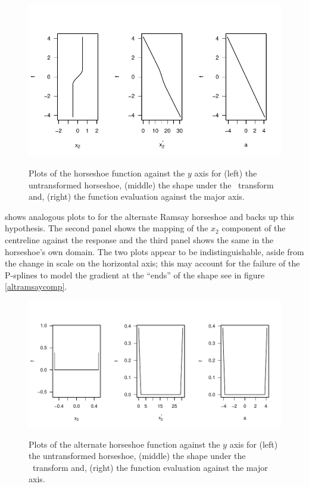 \begin{figure}[t]
\centering
\includegraphics[width=\textwidth]{sc/figs/centrelinelineplots.pdf} \\
\caption{Plots of the horseshoe function against the $y$ axis for (left) the untransformed horseshoe, (middle) the shape under the \sch\ transform and, (right) the function evaluation against the major axis.}
\label{centrelinelineplot}
\end{figure}

 shows analogous plots to  for the alternate Ramsay horseshoe and backs up this hypothesis. The second panel shows the mapping of the $x_2$ component of the centreline against the response and the third panel shows the same in the horseshoe's own domain. The two plots appear to be indistinguishable, aside from the change in scale on the horizontal axis; this may account for the failure of the P-splines to model the gradient at the ``ends'' of the shape see in figure \ref{altramsaycomp}.

\begin{figure}[t]
\centering
\includegraphics[width=\textwidth]{sc/figs/altcentrelinelineplots.pdf} \\
\caption{Plots of the alternate horseshoe function against the $y$ axis for (left) the untransformed horseshoe, (middle) the shape under the \sch\ transform and, (right) the function evaluation against the major axis.}
\label{altcentrelinelineplot}
\end{figure}

